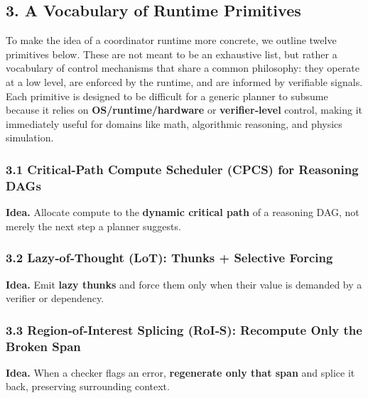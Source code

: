 \documentclass[
]{article}
\begin{document}
\hypertarget{a-vocabulary-of-runtime-primitives}{%
\subsection{3. A Vocabulary of Runtime
Primitives}\label{a-vocabulary-of-runtime-primitives}}

To make the idea of a coordinator runtime more concrete, we outline
twelve primitives below. These are not meant to be an exhaustive list,
but rather a vocabulary of control mechanisms that share a common
philosophy: they operate at a low level, are enforced by the runtime,
and are informed by verifiable signals. Each primitive is designed to be
difficult for a generic planner to subsume because it relies on
\textbf{OS/runtime/hardware} or \textbf{verifier‑level} control, making
it immediately useful for domains like math, algorithmic reasoning, and
physics simulation.

\hypertarget{criticalpath-compute-scheduler-cpcs-for-reasoning-dags}{%
\subsubsection{3.1 Critical‑Path Compute Scheduler (CPCS) for Reasoning
DAGs}\label{criticalpath-compute-scheduler-cpcs-for-reasoning-dags}}

\textbf{Idea.} Allocate compute to the \textbf{dynamic critical path} of
a reasoning DAG, not merely the next step a planner suggests.

\hypertarget{lazyofthought-lot-thunks-selective-forcing}{%
\subsubsection{3.2 Lazy‑of‑Thought (LoT): Thunks + Selective
Forcing}\label{lazyofthought-lot-thunks-selective-forcing}}

\textbf{Idea.} Emit \textbf{lazy thunks} and force them only when their
value is demanded by a verifier or dependency.

\hypertarget{regionofinterest-splicing-rois-recompute-only-the-broken-span}{%
\subsubsection{3.3 Region‑of‑Interest Splicing (RoI‑S): Recompute Only
the Broken
Span}\label{regionofinterest-splicing-rois-recompute-only-the-broken-span}}

\textbf{Idea.} When a checker flags an error, \textbf{regenerate only
that span} and splice it back, preserving surrounding context.
\end{document}
